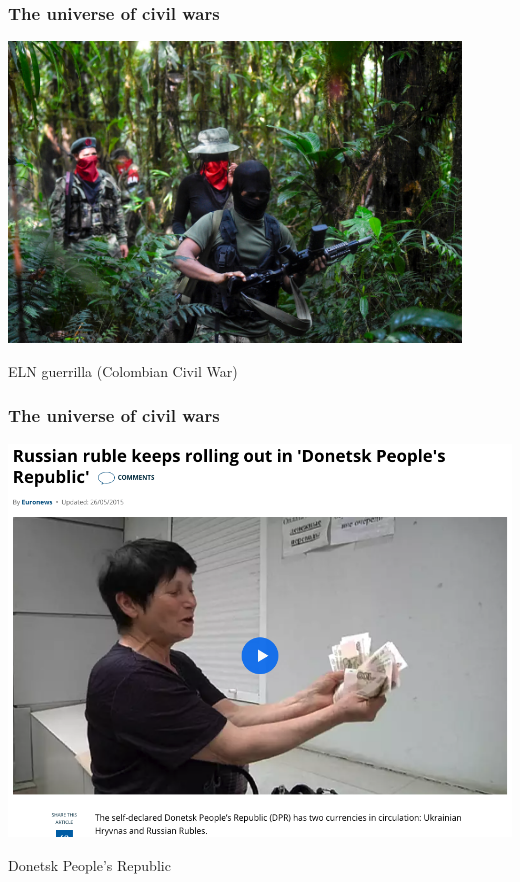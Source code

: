 \documentclass[utf8, xcolor=dvipsnames]{beamer}
\begin{document}
\begin{frame}
\frametitle{The universe of civil wars}
\centering

\includegraphics[width = 0.9\textwidth]{img/colombia}

\vspace{15pt}

ELN guerrilla (Colombian Civil War)

\end{frame}

\begin{frame}
\frametitle{The universe of civil wars}
\centering

\includegraphics[width = \textwidth]{img/donbas}

\vspace{15pt}

Donetsk People's Republic

\end{frame}
\end{document}
